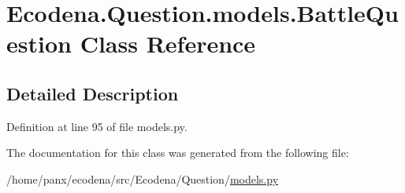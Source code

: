 \hypertarget{class_ecodena_1_1_question_1_1models_1_1_battle_question}{
\section{Ecodena.Question.models.BattleQuestion Class Reference}
\label{d8/d19/class_ecodena_1_1_question_1_1models_1_1_battle_question}
}


\subsection{Detailed Description}


Definition at line 95 of file models.py.



The documentation for this class was generated from the following file:\begin{DoxyCompactItemize}
\item 
/home/panx/ecodena/src/Ecodena/Question/\hyperlink{_question_2models_8py}{models.py}\end{DoxyCompactItemize}
